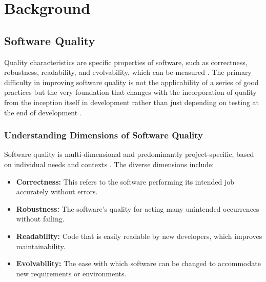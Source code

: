 
%

\chapter{Background}
\label{cha:Background}


\section{Software Quality}

Quality characteristics are specific properties of software, such as correctness, robustness, readability, and evolvability, which can be measured \cite{MetricsMaintainability1994}. The primary difficulty in improving software quality is not the applicability of a series of good practices but the very foundation that changes with the incorporation of quality from the inception itself in development rather than just depending on testing at the end of development \cite{lientz1980software}.

\subsection{Understanding Dimensions of Software Quality}

Software quality is multi-dimensional and predominantly project-specific, based on individual needs and contexts \cite{MetricsMaintainability1994}. The diverse dimensions include:

\begin{itemize}
    \item \textbf{Correctness:} This refers to the software performing its intended job accurately without errors.
    
    \item \textbf{Robustness:} The software's quality for acting many unintended occurrences without failing. 
    
    \item \textbf{Readability:} Code that is easily readable by new developers, which improves maintainability.

    \item \textbf{Evolvability:} The ease with which software can be changed to accommodate new requirements or environments.
\end{itemize}

